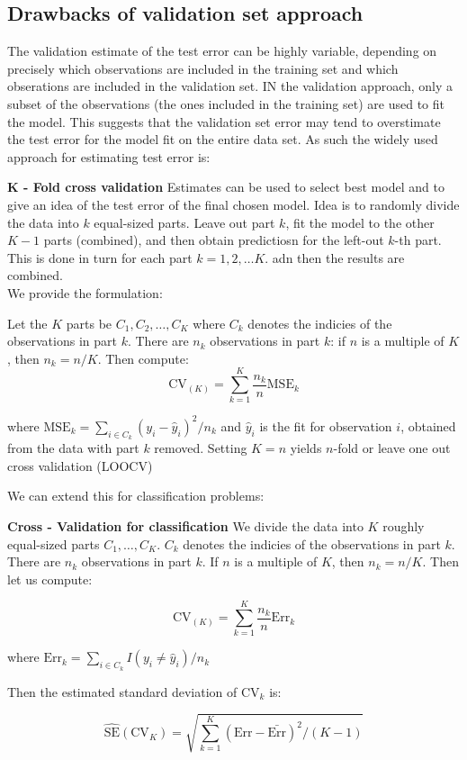 \documentclass[twoside]{article}
\theoremstyle{definition}
\theoremstyle{definition}
\begin{document}
\subsection{Drawbacks of validation set approach} 

The validation estimate of the test error can be highly variable, depending on precisely which observations are included in the training set and which obserations are included in the validation set. IN the validation approach, only a subset of the observations (the ones included in the training set) are used to fit the model. This suggests that the validation set error may tend to overstimate the test error for the model fit on the entire data set. As such the widely used approach for estimating test error is:

\begin{dBox}
	\textbf{K - Fold cross validation}
	Estimates can be used to select best model and to give an idea of the test error of the final chosen model. Idea is to randomly divide the data into $k$ equal-sized parts. Leave out part $k$, fit the model to the other $K-1$ parts (combined), and then obtain predictiosn for the left-out $k$-th part.  This is done in turn for each part $k = 1, 2, \dots K$. adn then the results are combined.
\\
We provide the formulation:

Let the $K$ parts be $C_1, C_2, \dots, C_K$ where $C_k$ denotes the indicies of the observations in part $k$. There are $n_k$ observations in part $k$: if $n$ is a multiple of $K$, then $n_k = n/K$. Then compute:
\begin{equation}
	\text{CV}_(K) = \sum^K_{k=1} \frac{n_k}{n} \text{MSE}_k
\end{equation}

where $\text{MSE}_k = \sum_{i \in C_k} (y_i - \hat{y}_i)^2/n_k$ and $\hat{y}_i$ is the fit for observation $i$, obtained from the data with part $k$ removed.  Setting $K = n$ yields $n$-fold or leave one out cross validation (LOOCV)
\end{dBox}

We can extend this for classification problems:

\begin{dBox}
	\textbf{Cross - Validation for classification}
	We divide the data into $K$ roughly equal-sized parts $C_1, \dots, C_K$. $C_k$ denotes the indicies of the observations in part $k$. There are $n_k$ observations in part $k$. If $n$ is a multiple of $K$, then $n_k = n/K$. Then let us compute:

\begin{equation}
	\text{CV}_(K) = \sum^K_{k=1} \frac{n_k}{n} \text{Err}_k
\end{equation}

where $\text{Err}_k = \sum_{i\in C_k} I (y_i \neq \hat{y}_i)/n_k$

Then the estimated standard deviation of $\text{CV}_k$ is:

\begin{equation}
	\hat{\text{SE}}( \text{CV}_K) = \sqrt{\sum^K_{k=1}(\text{Err} -\bar{\text{Err}})^2/(K-1)}
\end{equation}

\end{dBox}
\end{document}
